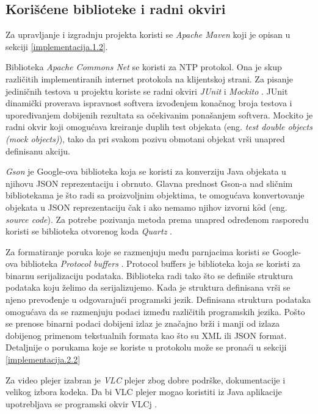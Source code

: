 \documentclass[12pt,oneside]{memoir}
\begin{document}
\subsection{Korišćene biblioteke i radni okviri}
\label{implementacija.2.1}

Za upravljanje i izgradnju projekta koristi se \textit{Apache Maven} \cite{Maven} koji je opisan u sekciji \ref{implementacija.1.2}. 

Biblioteka \textit{Apache Commons Net} \cite{CommonsNet} se koristi za NTP protokol. Ona je skup različitih implementiranih internet protokola na klijentskoj strani. Za pisanje jediničnih testova u projektu koriste se radni okviri \textit{JUnit} \cite{Junit} i \textit{Mockito} \cite{Mockito}. JUnit dinamički proverava ispravnost softvera izvođenjem konačnog broja testova i upoređivanjem dobijenih rezultata sa očekivanim ponašanjem softvera. Mockito je radni okvir koji omogućava kreiranje duplih test objekata (eng. \textit{test double objects (mock objects)}), tako da pri svakom pozivu obmotani objekat vrši unapred definisanu akciju.

\textit{Gson} \cite{Gson} je Google-ova biblioteka koja se koristi za konverziju Java objekata u njihovu JSON reprezentaciju i obrnuto. Glavna prednost Gson-a nad sličnim bibliotekama je što radi sa proizvoljnim objektima, te omogućava konvertovanje objekata u JSON reprezentaciju čak i ako nemamo njihov izvorni k$\hat{o}$d (eng. \textit{source code}). Za potrebe pozivanja metoda prema unapred određenom rasporedu koristi se biblioteka otvorenog koda \textit{Quartz} \cite{Quartz}. 

Za formatiranje poruka koje se razmenjuju među parnjacima koristi se Google-ova biblioteka \textit{Protocol buffers} \cite{ProtocolBuffers}. Protocol buffers je biblioteka koja se koristi za binarnu serijalizaciju podataka. Biblioteka radi tako što se definiše struktura podataka koju želimo da serijalizujemo. Kada je struktura definisana vrši se njeno prevođenje u odgovarajući programski jezik. Definisana struktura podataka omogućava da se razmenjuju podaci između različitih programskih jezika. Pošto se prenose binarni podaci dobijeni izlaz je značajno brži i manji od izlaza dobijenog primenom tekstualnih formata kao što su XML ili JSON format. Detaljnije o porukama koje se koriste u protokolu može se pronaći u sekciji \ref{implementacija.2.2} 

Za video plejer izabran je \textit{VLC} plejer \cite{VLC} zbog dobre podrške, dokumentacije i velikog izbora kodeka. Da bi VLC plejer mogao koristiti iz Java aplikacije upotrebljava se programski okvir VLCj \cite{VLCJ}. 
\end{document}
